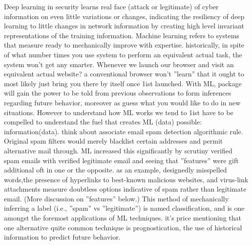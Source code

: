 
Deep learning in security learns real face (attack or legitimate) of cyber information on even little
variations or changes, indicating the resiliency of deep learning to little changes in network information by
creating high level invariant representations of the training information. Machine learning refers to systems
that  measure ready to mechanically improve with expertise. historically, in spite of what number times you
use system to perform an equivalent actual task, the system won’t get any smarter. Whenever we launch our
browser and visit an equivalent actual website? a conventional browser won’t ”learn” that it ought to most likely
just bring you there by itself once 1ist launched. With ML, package will gain the power to be told from
previous observations to form inferences regarding  future behavior, moreover as guess what you would like to
do in new situations.  However to understand how ML works we tend to 1ist have to be compelled to understand the fuel that creates ML (data)
possible: information(data). think about associate email spam detection algorithmic rule. Original spam filters would merely blacklist
certain addresses and permit alternative mail through. ML increased this significantly by scrutiny verified
spam emails with verified legitimate email and seeing that ”features” were gift additional oft in
one or the opposite. as an example, designedly misspelled words,the presence of hyperlinks
to best-known malicious websites, and virus-link attachments  measure doubtless options indicative of spam rather
than legitimate email. (More discussion on ”features” below.) This method of mechanically inferring a
label (i.e., ”spam” vs ”legitimate”) is named classification, and is one amongst the foremost applications of ML
techniques. it's price mentioning that one alternative quite common technique is prognostication, the use of
historical information to predict future behavior.

